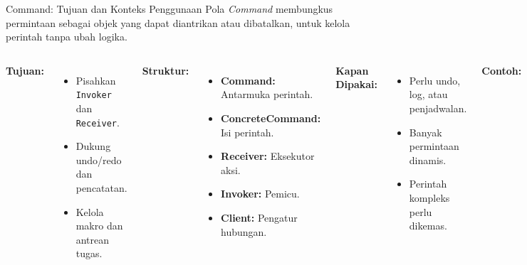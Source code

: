 \documentclass[aspectratio=169, table]{beamer}
\begin{document}
\begin{frame}{Command: Tujuan dan Konteks Penggunaan}
	\vspace{15pt}
	Pola \textit{Command} membungkus permintaan sebagai objek yang dapat diantrikan atau dibatalkan, untuk kelola perintah tanpa ubah logika.
	\vspace{1pt}
	\begin{columns}[T]
		\textbf{Tujuan:}
		\begin{itemize}
			\item Pisahkan \texttt{Invoker} dan \texttt{Receiver}.
			\item Dukung undo/redo dan pencatatan.
			\item Kelola makro dan antrean tugas.
		\end{itemize}
		
		\textbf{Struktur:}
		\begin{itemize}
			\item \textbf{Command:} Antarmuka perintah.
			\item \textbf{ConcreteCommand:} Isi perintah.
			\item \textbf{Receiver:} Eksekutor aksi.
			\item \textbf{Invoker:} Pemicu.
			\item \textbf{Client:} Pengatur hubungan.
		\end{itemize}
		
		\textbf{Kapan Dipakai:}
		\begin{itemize}
			\item Perlu undo, log, atau penjadwalan.
			\item Banyak permintaan dinamis.
			\item Perintah kompleks perlu dikemas.
		\end{itemize}
		
		\textbf{Contoh:}
		\begin{itemize}
			\item GUI: tombol sebagai \texttt{Command}.
			\item Remote untuk perangkat rumah.
			\item Game/editor: undo, redo, makro.
			\item Task queue dan job scheduler.
		\end{itemize}
	\end{columns}
\end{frame}
\end{document}
